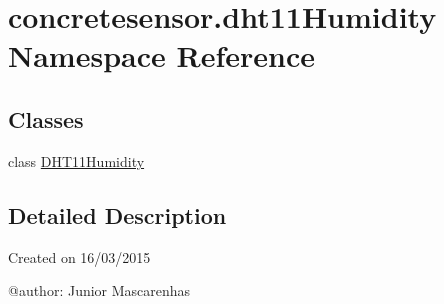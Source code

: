 \hypertarget{namespaceconcretesensor_1_1dht11Humidity}{}\section{concretesensor.\+dht11\+Humidity Namespace Reference}
\label{namespaceconcretesensor_1_1dht11Humidity}
\subsection*{Classes}
\begin{DoxyCompactItemize}
\item 
class \hyperlink{classconcretesensor_1_1dht11Humidity_1_1DHT11Humidity}{D\+H\+T11\+Humidity}
\end{DoxyCompactItemize}


\subsection{Detailed Description}
\begin{DoxyVerb}Created on 16/03/2015

@author: Junior Mascarenhas
\end{DoxyVerb}
 